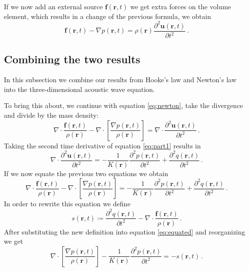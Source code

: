 If we now add an external source $\mathbf f(\mathbf r, t)$ we get extra forces on the volume element, which results in a change of the previous formula, we obtain
\begin{equation}
    \mathbf f(\mathbf r, t)- \nabla p (\mathbf r, t) = \rho(\mathbf r) \frac{\partial^2 \mathbf u(\mathbf r, t)}{\partial t^2} \,. \label{eq:newton}
\end{equation}

\subsection{Combining the two results}
In this subsection we combine our results from Hooke's law and Newton's law into the three-dimensional acoustic wave equation.

To bring this about, we continue with equation \ref{eq:newton}, take the divergence and divide by the mass density:
\begin{equation}
    \nabla \cdot \frac{\mathbf f(\mathbf r, t)}{\rho(\mathbf r)} - \nabla \cdot \left[ \frac{\nabla p (\mathbf r, t)}{\rho(\mathbf r)} \right] = \nabla \cdot \frac{\partial^2 \mathbf u(\mathbf r, t)}{\partial t^2} \,. \nonumber
\end{equation}
Taking the second time derivative of equation \ref{eq:part1} results in
\begin{equation}
    \nabla \cdot \frac{\partial^2 \mathbf u(\mathbf r, t)}{\partial t^2} = -\frac{1}{K(\mathbf r)}\frac{\partial^2 p(\mathbf r, t)}{\partial t^2} + \frac{\partial^2 q(\mathbf r, t)}{\partial t^2} \,. \nonumber
\end{equation}
If we now equate the previous two equations we obtain
\begin{equation}
    \nabla \cdot \frac{\mathbf f(\mathbf r, t)}{\rho(\mathbf r)} - \nabla \cdot \left[ \frac{\nabla p (\mathbf r, t)}{\rho(\mathbf r)} \right] =  -\frac{1}{K(\mathbf r)}\frac{\partial^2 p(\mathbf r, t)}{\partial t^2} + \frac{\partial^2 q(\mathbf r, t)}{\partial t^2} \,. \label{eq:equated}
\end{equation}
In order to rewrite this equation we define
\begin{equation}
    s(\mathbf r, t) \coloneq \frac{\partial^2 q(\mathbf r, t)}{\partial t^2} - \nabla \cdot \frac{\mathbf f(\mathbf r, t)}{\rho(\mathbf r)}\,. \nonumber
\end{equation}
After substituting the new definition into equation \ref{eq:equated} and reorganizing we get
\begin{equation}
    \nabla \cdot \left[ \frac{\nabla p (\mathbf r, t)}{\rho(\mathbf r)} \right] - \frac{1}{K(\mathbf r)}\frac{\partial^2 p(\mathbf r, t)}{\partial t^2} = - s(\mathbf r, t) \,.\nonumber
\end{equation}

